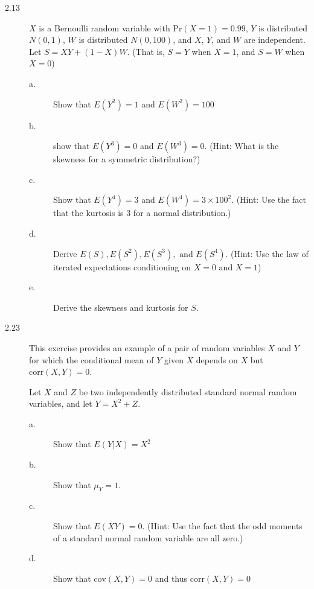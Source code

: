 \documentclass[a4paper,11pt]{article}
\newcommand{\cov}{\mathrm{cov}}
\newcommand{\corr}{\mathrm{corr}}
\newcommand{\pr}{\mathrm{Pr}}
\begin{document}
\begin{description}
\item[{2.13}] \(X\) is a Bernoulli random variable with \(\pr(X = 1) = 0.99\),
\(Y\) is distributed \(N(0, 1)\), \(W\) is distributed \(N(0,
          100)\), and \(X\), \(Y\), and \(W\) are independent. Let \(S=XY +
          (1-X)W\). (That is, \(S=Y\) when \(X=1\), and \(S=W\) when \(X=0\))
\begin{description}
\item[{a.}] Show that \(E(Y^2) = 1\) and \(E(W^2) = 100\)
\item[{b.}] show that \(E(Y^3) = 0\) and \(E(W^3) = 0\). (Hint: What is the
skewness for a symmetric distribution?)
\item[{c.}] Show that \(E(Y^4) = 3\) and \(E(W^4) = 3 \times 100^2\). (Hint: Use
the fact that the kurtosis is 3 for a normal distribution.)
\item[{d.}] Derive \(E(S), E(S^2), E(S^3), \text{ and } E(S^4)\). (Hint: Use
the law of iterated expectations conditioning on \(X=0 \text{ and
     } X=1\))
\item[{e.}] Derive the skewness and kurtosis for \(S\).
\end{description}
\end{description}


\begin{description}
\item[{2.23}] This exercise provides an example of a pair of random
variables \(X\) and \(Y\) for which the conditional mean of \(Y\)
given \(X\) depends on \(X\) but \(\corr(X, Y)=0\).

Let \(X\) and \(Z\) be two independently distributed standard
normal random variables, and let \(Y = X^2 + Z\).
\begin{description}
\item[{a.}] Show that \(E(Y|X) = X^2\)
\item[{b.}] Show that \(\mu_Y = 1\).
\item[{c.}] Show that \(E(XY) = 0\). (Hint: Use the fact that the odd
moments of a standard normal random variable are all zero.)
\item[{d.}] Show that \(\cov(X, Y) = 0\) and thus \(\corr(X, Y) = 0\)
\end{description}
\end{description}
\end{document}
